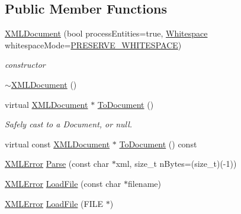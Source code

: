 \subsection*{Public Member Functions}
\begin{DoxyCompactItemize}
\item 
\mbox{\hyperlink{classtinyxml2_1_1_x_m_l_document_a57ddf17b6e054dda10af98991b1b8f70}{X\+M\+L\+Document}} (bool process\+Entities=true, \mbox{\hyperlink{namespacetinyxml2_a7f91d00f77360f850fd5da0861e27dd5}{Whitespace}} whitespace\+Mode=\mbox{\hyperlink{namespacetinyxml2_a7f91d00f77360f850fd5da0861e27dd5a751769aa625fe5fe5286e9779edec56a}{P\+R\+E\+S\+E\+R\+V\+E\+\_\+\+W\+H\+I\+T\+E\+S\+P\+A\+CE}})
\begin{DoxyCompactList}\small\item\em constructor \end{DoxyCompactList}\item 
\mbox{\hyperlink{classtinyxml2_1_1_x_m_l_document_af37c47d8e2ba4b2fc81b21a77a32579b}{$\sim$\+X\+M\+L\+Document}} ()
\item 
virtual \mbox{\hyperlink{classtinyxml2_1_1_x_m_l_document}{X\+M\+L\+Document}} $\ast$ \mbox{\hyperlink{classtinyxml2_1_1_x_m_l_document_a3e185f880882bd978367bb55937735ec}{To\+Document}} ()
\begin{DoxyCompactList}\small\item\em Safely cast to a Document, or null. \end{DoxyCompactList}\item 
virtual const \mbox{\hyperlink{classtinyxml2_1_1_x_m_l_document}{X\+M\+L\+Document}} $\ast$ \mbox{\hyperlink{classtinyxml2_1_1_x_m_l_document_a747ab173887d969fe313b4617f968e99}{To\+Document}} () const
\item 
\mbox{\hyperlink{namespacetinyxml2_a1fbf88509c3ac88c09117b1947414e08}{X\+M\+L\+Error}} \mbox{\hyperlink{classtinyxml2_1_1_x_m_l_document_a1819bd34f540a7304c105a6232d25a1f}{Parse}} (const char $\ast$xml, size\+\_\+t n\+Bytes=(size\+\_\+t)(-\/1))
\item 
\mbox{\hyperlink{namespacetinyxml2_a1fbf88509c3ac88c09117b1947414e08}{X\+M\+L\+Error}} \mbox{\hyperlink{classtinyxml2_1_1_x_m_l_document_a2ebd4647a8af5fc6831b294ac26a150a}{Load\+File}} (const char $\ast$filename)
\item 
\mbox{\hyperlink{namespacetinyxml2_a1fbf88509c3ac88c09117b1947414e08}{X\+M\+L\+Error}} \mbox{\hyperlink{classtinyxml2_1_1_x_m_l_document_a5f1d330fad44c52f3d265338dd2a6dc2}{Load\+File}} (F\+I\+LE $\ast$)
\item 

\end{DoxyCompactItemize}
